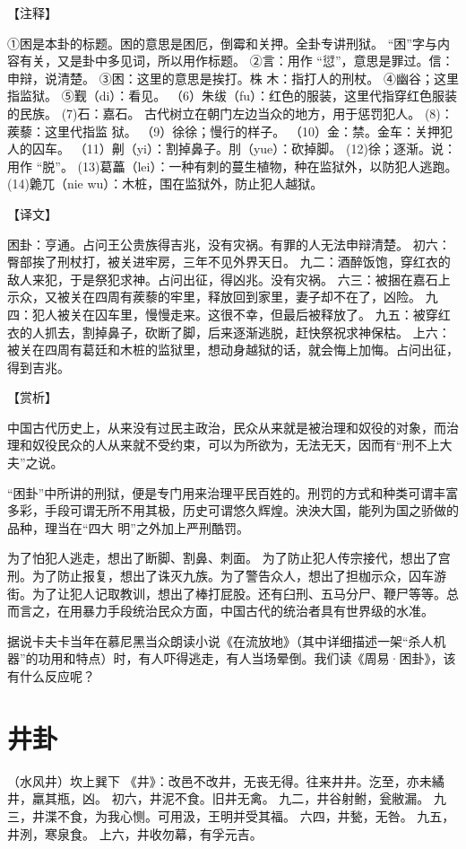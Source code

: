 \documentclass[a4paper,12pt,UTF8,twoside]{ctexbook}
\begin{document}
【注释】

①困是本卦的标题。困的意思是困厄，倒霉和关押。全卦专讲刑狱。 “困”字与内容有关，又是卦中多见词，所以用作标题。
②言：用作 “愆”，意思是罪过。信：申辩，说清楚。
③困：这里的意思是挨打。株 木：指打人的刑杖。
④幽谷；这里指监狱。
⑤觐（di）：看见。
（6）朱绂（fu）：红色的服装，这里代指穿红色服装的民族。
(7)石：嘉石。 古代树立在朝门左边当众的地方，用于惩罚犯人。
(8)：蒺藜：这里代指监 狱。
（9）徐徐；慢行的样子。
（10）金：禁。金车：关押犯人的囚车。
（11）劓（yi）：割掉鼻子。刖（yue）：砍掉脚。
(12)徐；逐渐。说：用作 “脱”。
(13)葛藟（lei）：一种有刺的蔓生植物，种在监狱外，以防犯人逃跑。
(14)臲兀（nie wu）：木桩，围在监狱外，防止犯人越狱。

【译文】

困卦：亨通。占问王公贵族得吉兆，没有灾祸。有罪的人无法申辩清楚。
初六：臀部挨了刑杖打，被关进牢房，三年不见外界天日。
九二：酒醉饭饱，穿红衣的敌人来犯，于是祭犯求神。占问出征，得凶兆。没有灾祸。
六三：被捆在嘉石上示众，又被关在四周有蒺藜的牢里，释放回到家里，妻子却不在了，凶险。
九四：犯人被关在囚车里，慢慢走来。这很不幸，但最后被释放了。
九五：被穿红衣的人抓去，割掉鼻子，砍断了脚，后来逐渐逃脱，赶快祭祝求神保枯。
上六：被关在四周有葛廷和木桩的监狱里，想动身越狱的话，就会悔上加悔。占问出征，得到吉兆。

【赏析】

中国古代历史上，从来没有过民主政治，民众从来就是被治理和奴役的对象，而治理和奴役民众的人从来就不受约束，可以为所欲为，无法无天，因而有“刑不上大夫”之说。

“困卦”中所讲的刑狱，便是专门用来治理平民百姓的。刑罚的方式和种类可谓丰富多彩，手段可谓无所不用其极，历史可谓悠久辉煌。泱泱大国，能列为国之骄做的品种，理当在“四大 明”之外加上严刑酷罚。

为了怕犯人逃走，想出了断脚、割鼻、刺面。 为了防止犯人传宗接代，想出了宫刑。为了防止报复，想出了诛灭九族。为了警告众人，想出了担枷示众，囚车游街。为了让犯人记取教训，想出了棒打屁股。还有臼刑、五马分尸、鞭尸等等。总而言之，在用暴力手段统治民众方面，中国古代的统治者具有世界级的水准。

据说卡夫卡当年在慕尼黑当众朗读小说《在流放地》（其中详细描述一架“杀人机器”的功用和特点）时，有人吓得逃走，有人当场晕倒。我们读《周易·困卦》，该有什么反应呢？

\chapter{井卦}

（水风井）坎上巽下
《井》：改邑不改井，无丧无得。往来井井。汔至，亦未繘井，羸其瓶，凶。
初六，井泥不食。旧井无禽。
九二，井谷射鲋，瓮敝漏。
九三，井渫不食，为我心恻。可用汲，王明并受其福。
六四，井甃，无咎。
九五，井洌，寒泉食。
上六，井收勿幕，有孚元吉。
\end{document}
